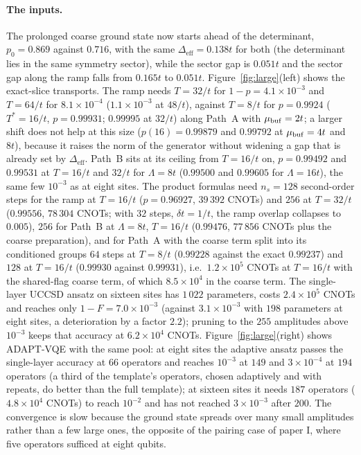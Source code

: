 \documentclass[a4paper,11pt,noarxiv]{quantumarticle}
\newcommand{\Deff}{\Delta_{\mathrm{eff}}}
\begin{document}
\paragraph{The inputs.}
The prolonged coarse ground state now starts ahead of the determinant,
$p_0=0.869$ against $0.716$, with the same $\Deff=0.138t$ for both (the
determinant lies in the same symmetry sector), while the sector gap is
$0.051t$ and the sector gap along the ramp falls from $0.165t$ to $0.051t$.
Figure~\ref{fig:large}(left) shows the exact-slice transports.  The ramp
needs $T=32/t$ for $1-p=4.1\times10^{-3}$ and $T=64/t$ for $8.1\times10^{-4}$
($1.1\times10^{-3}$ at $48/t$), against $T=8/t$ for $p=0.9924$
($T^*=16/t$, $p=0.99931$; $0.99995$ at $32/t$) along Path~A with
$\mu_{\rm buf}=2t$; a larger shift does not help at this size
($p(16)=0.99879$ and $0.99792$ at $\mu_{\rm buf}=4t$ and $8t$), because it
raises the norm of the generator without widening a gap that is already set
by $\Deff$.  Path~B sits at its ceiling from $T=16/t$ on, $p=0.99492$ and
$0.99531$ at $T=16/t$ and $32/t$ for $\Lambda=8t$ ($0.99500$ and $0.99605$
for $\Lambda=16t$), the same few $10^{-3}$ as at eight sites.  The product
formulas need $n_s=128$ second-order steps for the ramp at $T=16/t$
($p=0.96927$, $39\,392$ CNOTs) and $256$ at $T=32/t$ ($0.99556$, $78\,304$
CNOTs; with $32$ steps, $\delta t=1/t$, the ramp overlap collapses to
$0.005$), $256$ for Path~B at $\Lambda=8t$, $T=16/t$ ($0.99476$, $77\,856$
CNOTs plus the coarse preparation), and for Path~A with the coarse term
split into its conditioned groups $64$ steps at $T=8/t$ ($0.99228$ against
the exact $0.99237$) and $128$ at $T=16/t$ ($0.99930$ against $0.99931$),
i.e.\ $1.2\times10^5$ CNOTs at $T=16/t$ with the shared-flag coarse term,
of which $8.5\times10^4$ in the coarse term.  The single-layer UCCSD
ansatz on sixteen sites has $1\,022$ parameters, costs $2.4\times10^5$
CNOTs and reaches only $1-F=7.0\times10^{-3}$ (against $3.1\times10^{-3}$
with $198$ parameters at eight sites, a deterioration by a factor $2.2$);
pruning to the $255$ amplitudes above $10^{-3}$ keeps that accuracy at
$6.2\times10^4$ CNOTs.  Figure~\ref{fig:large}(right) shows ADAPT-VQE with
the same pool: at eight sites the adaptive ansatz passes the single-layer
accuracy at $66$ operators and reaches $10^{-3}$ at $149$ and
$3\times10^{-4}$ at $194$ operators (a third of the template's operators,
chosen adaptively and with repeats, do better than the full template); at
sixteen sites it needs $187$ operators ($4.8\times10^4$ CNOTs) to reach
$10^{-2}$ and has not reached $3\times10^{-3}$ after $200$.  The
convergence is slow because the ground state spreads over many small
amplitudes rather than a few large ones, the opposite of the pairing case
of paper I, where five operators sufficed at eight qubits.
\end{document}
